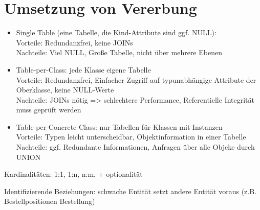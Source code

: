 \section*{Umsetzung von Vererbung}
\begin{itemize}
\item Single Table (eine Tabelle, die Kind-Attribute sind ggf. NULL): \\
Vorteile: Redundanzfrei, keine JOINs \\
Nachteile: Viel NULL, Große Tabelle, nicht über mehrere Ebenen
\item Table-per-Class: jede Klasse eigene Tabelle \\
Vorteile: Redundanzfrei, Einfacher Zugriff auf typunabhängige Attribute der Oberklasse, keine NULL-Werte  \\
Nachteile: JOINs nötig => schlechtere Performance, Referentielle Integrität muss geprüft werden
\item  Table-per-Concrete-Class: nur Tabellen für Klassen mit Instanzen \\
Vorteile: Typen leicht unterscheidbar, Objektinformation in einer Tabelle \\
Nachteile: ggf. Redundante Informationen, Anfragen über alle Objeke durch UNION
\end{itemize}


Kardinalitäten: 1:1, 1:n, n:m, + optionalität

Identifizierende Beziehungen: schwache Entität setzt andere Entität voraus (z.B. Bestellpositionen Bestellung)



